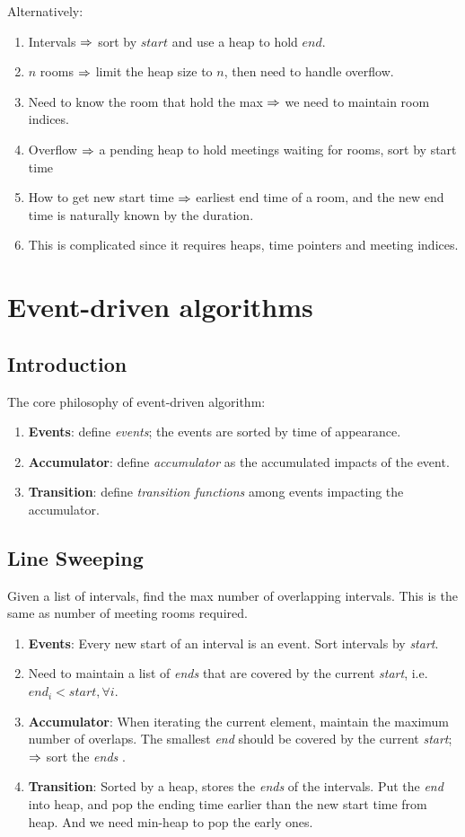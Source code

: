 Alternatively:
\begin{enumerate}
\item Intervals $\Rightarrow$ sort by $start$ and use a heap to hold $end$.
\item $n$ rooms $\Rightarrow$ limit the heap size to $n$, then need to handle overflow. 
\item Need to know the room that hold the max $\Rightarrow$ we need to maintain room indices. 
\item Overflow $\Rightarrow$ a pending heap to hold meetings waiting for rooms, sort by start time
\item How to get new start time $\Rightarrow$ earliest end time of a room, and the new end time is naturally known by the duration. 
\item This is complicated since it requires heaps, time pointers and meeting indices. 
\end{enumerate}

\section{Event-driven algorithms}
\subsection{Introduction}
The core philosophy of event-driven algorithm:
\begin{enumerate}
\item \textbf{Events}: define \textit{events}; the events are sorted by time of appearance.
\item \textbf{Accumulator}: define \textit{accumulator} as the accumulated impacts of the event.
\item \textbf{Transition}: define \textit{transition functions} among events impacting the accumulator.
\end{enumerate} 

\subsection{Line Sweeping}
 Given a list of intervals, find the max number of overlapping intervals. This is the same as number of meeting rooms required. 

\begin{enumerate}
\item \textbf{Events}: Every new start of an interval is an event. Sort intervals by \textit{start}.
\item Need to maintain a list of \textit{ends} that are covered by the current \textit{start}, i.e. $end_i < start, \forall i$.
\item \textbf{Accumulator}: When iterating the current element, maintain the maximum number of overlaps. The smallest \textit{end} should be covered by the current \textit{start}; $\Rightarrow$ sort the \textit{ends} .
\item \textbf{Transition}:  Sorted by a heap, stores the \textit{ends} of the intervals. Put the \textit{end} into heap, and pop the ending time earlier than the new start time from heap. And we need min-heap to pop the early ones.
\end{enumerate}

